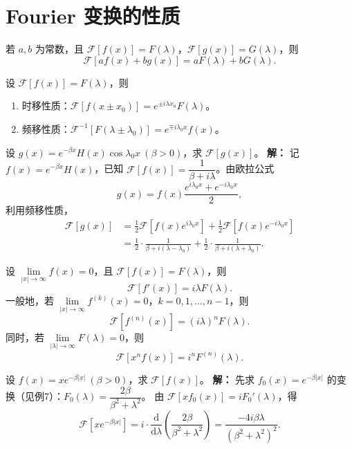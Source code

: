 \section{Fourier 变换的性质}

\begin{theorem}[线性性质]
  若 $a,b$ 为常数，且 $\mathcal{F}[f(x)]=F(\lambda)$，$\mathcal{F}[g(x)]=G(\lambda)$，则
  \[
  \mathcal{F}[af(x)+bg(x)]=aF(\lambda)+bG(\lambda).
  \]
\end{theorem}

\begin{theorem}[位移性质]
  设 $\mathcal{F}[f(x)]=F(\lambda)$，则
  \begin{enumerate}
    \item 时移性质：$\mathcal{F}[f(x\pm x_0)]=e^{\pm i\lambda x_0}F(\lambda)$。
    \item 频移性质：$\mathcal{F}^{-1}[F(\lambda\pm\lambda_0)]=e^{\mp i\lambda_0 x}f(x)$。
  \end{enumerate}
\end{theorem}

\begin{tcolorbox}[title=例 9：位移性质应用, colframe=orange!75!black, colback=orange!5!white, sharp corners]
  设 $g(x)=e^{-\beta x}H(x)\cos\lambda_0 x\ (\beta>0)$，求 $\mathcal{F}[g(x)]$。
  \tcbline
  \textbf{解：} 记 $f(x)=e^{-\beta x}H(x)$，已知 $\mathcal{F}[f(x)]=\dfrac{1}{\beta+i\lambda}$。由欧拉公式
  \[
  g(x)=f(x)\frac{e^{i\lambda_0 x}+e^{-i\lambda_0 x}}{2},
  \]
  利用频移性质，
  \[
  \begin{aligned}
    \mathcal{F}[g(x)]
    &=\frac{1}{2}\mathcal{F}[f(x)e^{i\lambda_0 x}]+\frac{1}{2}\mathcal{F}[f(x)e^{-i\lambda_0 x}]\\
    &=\frac{1}{2}\cdot\frac{1}{\beta+i(\lambda-\lambda_0)}+\frac{1}{2}\cdot\frac{1}{\beta+i(\lambda+\lambda_0)}.
  \end{aligned}
  \]
\end{tcolorbox}

\begin{theorem}[微分性质]
  设 $\lim\limits_{|x|\to\infty}f(x)=0$，且 $\mathcal{F}[f(x)]=F(\lambda)$，则
  \[
  \mathcal{F}[f'(x)]=i\lambda F(\lambda).
  \]
  一般地，若 $\lim\limits_{|x|\to\infty}f^{(k)}(x)=0$，$k=0,1,\dots,n-1$，则
  \[
  \mathcal{F}[f^{(n)}(x)]=(i\lambda)^n F(\lambda).
  \]
  同时，若 $\lim\limits_{|\lambda|\to\infty}F(\lambda)=0$，则
  \[
  \mathcal{F}[x^n f(x)] = i^n F^{(n)}(\lambda).
  \]
\end{theorem}

\begin{tcolorbox}[title=例 10：微分性质应用, colframe=orange!75!black, colback=orange!5!white, sharp corners]
  设 $f(x)=xe^{-\beta|x|}\ (\beta>0)$，求 $\mathcal{F}[f(x)]$。
  \tcbline
  \textbf{解：} 先求 $f_0(x)=e^{-\beta|x|}$ 的变换（见例7）：$F_0(\lambda)=\dfrac{2\beta}{\beta^2+\lambda^2}$。
  由 $\mathcal{F}[x f_0(x)] = i F_0'(\lambda)$，得
  \[
  \mathcal{F}[x e^{-\beta|x|}]=i\cdot\frac{\mathrm{d}}{\mathrm{d}\lambda}\left(\frac{2\beta}{\beta^2+\lambda^2}\right)
  =\frac{-4i\beta\lambda}{(\beta^2+\lambda^2)^2}.
  \]
\end{tcolorbox}

